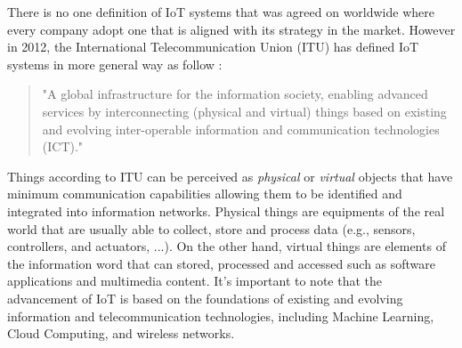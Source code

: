 \documentclass[conference]{IEEEtran}
\begin{document}
There is no one definition of IoT systems that was agreed on worldwide where every company adopt one that is aligned with its strategy in the market.
However in 2012, the International Telecommunication Union (ITU) has defined IoT systems in more general way as follow \cite{itu-t_overview_2012_Y.2060}:
\begin{quote}
"A global infrastructure for the information society, enabling advanced services by interconnecting (physical and virtual) things based on existing and evolving inter-operable information and communication technologies (ICT)."
\end{quote}
Things according to ITU can be perceived as \textit{physical} or \textit{virtual} objects that have minimum communication capabilities allowing them to be identified and integrated into information networks. Physical things are equipments of the real world that are usually able to collect, store and process data (e.g., sensors, controllers, and actuators, ...). On the other hand, virtual things are elements of the information word that can stored, processed and accessed such as software applications and multimedia content. It's important to note that the advancement of IoT is based on the foundations of existing and evolving information and telecommunication technologies, including Machine Learning, Cloud Computing, and wireless networks.
\end{document}

